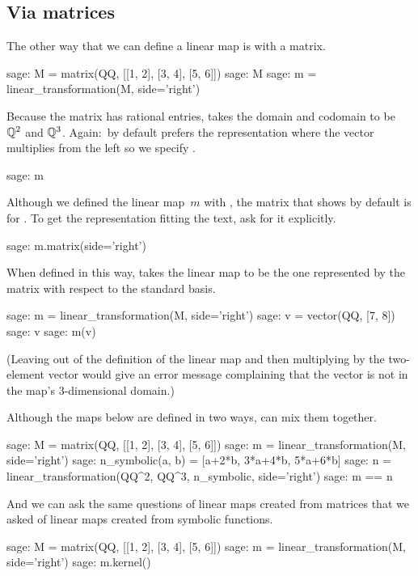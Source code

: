 \subsection{Via matrices}
The other way that we can define a linear map is with
a matrix.
\begin{sagecommandline}
sage: M = matrix(QQ, [[1, 2], [3, 4], [5, 6]])
sage: M
sage: m = linear_transformation(M, side='right')
\end{sagecommandline}
Because the matrix has rational entries, \Sage{} takes the
domain and codomain to be $\mathbb{Q}^2$ and $\mathbb{Q}^3$.
Again:~by default \Sage{} prefers the 
representation where the vector multiplies
from the left so we specify .
\begin{sagecommandline}
sage: m 
\end{sagecommandline}
Although we defined the linear map~$m$ with
\mbox{,} 
the matrix that \Sage{} shows by default is for 
.
To get the representation fitting the text, ask for it explicitly.
\begin{sagecommandline}
sage: m.matrix(side='right')
\end{sagecommandline}

When defined in this way, \Sage{} takes the linear map to be the one
represented by the matrix with respect to the standard basis.
\begin{sagecommandline}
sage: m = linear_transformation(M, side='right')
sage: v = vector(QQ, [7, 8])
sage: v
sage: m(v)  
\end{sagecommandline}
(Leaving  out of the definition of the
linear map and then multiplying 
by the two-element vector would give an error message
complaining that the vector is not in the map's 
$3$-dimensional domain.)

Although the maps below are defined in two ways, 
\Sage{} can mix them together.
\begin{sagecommandline}
sage: M = matrix(QQ, [[1, 2], [3, 4], [5, 6]])
sage: m = linear_transformation(M, side='right')
sage: n_symbolic(a, b) = [a+2*b, 3*a+4*b, 5*a+6*b]
sage: n = linear_transformation(QQ^2, QQ^3, n_symbolic, side='right')
sage: m == n  
\end{sagecommandline}
And we can ask the same questions of linear maps created from
matrices that we asked of linear maps created from symbolic functions.
\begin{sagecommandline}
sage: M = matrix(QQ, [[1, 2], [3, 4], [5, 6]])
sage: m = linear_transformation(M, side='right')
sage: m.kernel() 
\end{sagecommandline}

